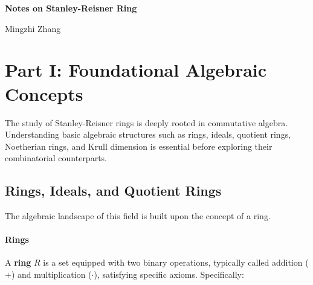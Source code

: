 \documentclass[12pt]{article}
\theoremstyle{definition}
\numberwithin{equation}{subsection}
\begin{document}
\sloppy
\begin{center}
    {\Large\bf Notes on Stanley-Reisner Ring}
\end{center}
\vskip 3mm
\begin{center}
    Mingzhi Zhang
\end{center}
\vskip 3mm

\section*{Part I: Foundational Algebraic Concepts}

The study of Stanley-Reisner rings is deeply rooted in commutative algebra. Understanding basic algebraic structures such as rings, ideals, quotient rings, Noetherian rings, and Krull dimension is essential before exploring their combinatorial counterparts.

\subsection{Rings, Ideals, and Quotient Rings}

The algebraic landscape of this field is built upon the concept of a ring.

\paragraph{Rings}
A \textbf{ring} $R$ is a set equipped with two binary operations, typically called addition ($+$) and multiplication ($\cdot$), satisfying specific axioms. Specifically:
\end{document}
